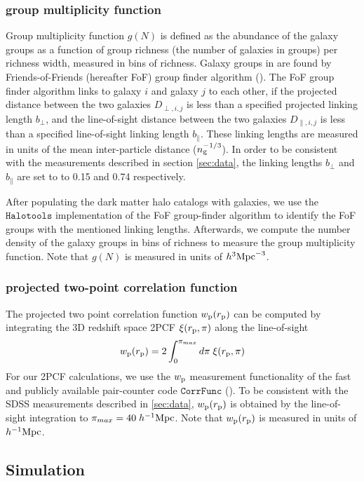 \documentclass[12pt, preprint]{emulateapj}
\newcommand{\beq}{\begin{equation}}
\newcommand{\eeq}{\end{equation}}
\begin{document}
\subsubsection{group multiplicity function}
Group multiplicity function $g(N)$ is defined as the abundance of the galaxy groups as a 
function of group richness (the number of galaxies in groups) per richness width, measured in bins of richness. 
Galaxy groups in are found by Friends-of-Friends (hereafter FoF) group finder algorithm (\citealt{fof}). 
The FoF group finder algorithm links to galaxy $i$ and galaxy $j$ to each other, if the projected distance between the two galaxies $D_{\perp , i,j}$ is less than a specified projected linking length $b{_\perp}$, and the line-of-sight distance between the two galaxies $D_{\parallel, i,j}$ is less than a specified line-of-sight linking length $b{_\parallel}$. These linking lengths are measured in units of the mean inter-particle distance ($n_{\rm g}^{-1/3}$). In order to be consistent with the \citealt{berlind2006} measurements described in section \ref{sec:data}, the linking lengths $b_{\perp}$ and $b_{\parallel}$ are set to to 0.15 and 0.74 respectively. 

After populating the dark matter halo catalogs with galaxies, we use the $\mathtt{Halotools}$ implementation of the FoF group-finder algorithm to identify the FoF groups with the mentioned linking lengths. Afterwards, we compute the number density of the galaxy groups in bins of richness to measure the group multiplicity function. Note that $g(N)$ is measured in units of $h^{3}\rm{Mpc}^{-3}$.
\subsubsection{projected two-point correlation function}
The projected two point correlation function $w_{\rm{p}}(r_{\rm{p}})$ can be computed by integrating the 3D redshift space 2PCF $\xi(r_{\rm{p}} , \pi)$ along the line-of-sight
\beq
w_{\rm{p}}(r_{\rm{p}}) = 2 \int_{0}^{\pi_{max}} d\pi \;\xi(r_{\rm{p}} , \pi)
\eeq
For our 2PCF calculations, we use the $w_{\rm p}$ measurement functionality of the fast and publicly available pair-counter code $\mathtt{CorrFunc}$ (\citealt{corrfunc}).  To be consistent with the SDSS measurements described in \ref{sec:data}, $w_{\rm{p}}(r_{\rm{p}})$ is obtained by the line-of-sight integration to $\pi_{max}=40 \; h^{-1}\rm{Mpc}$. Note that $w_{\rm{p}}(r_{\rm{p}})$ is measured in units of $h^{-1}\rm{Mpc}$.

\subsection{Simulation}
\end{document}
